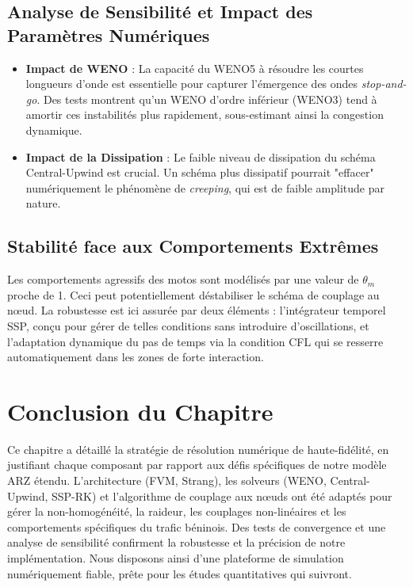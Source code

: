 \subsection{Analyse de Sensibilité et Impact des Paramètres Numériques}
\begin{itemize}
    \item \textbf{Impact de WENO} : La capacité du WENO5 à résoudre les courtes longueurs d'onde est essentielle pour capturer l'émergence des ondes \textit{stop-and-go}. Des tests montrent qu'un WENO d'ordre inférieur (WENO3) tend à amortir ces instabilités plus rapidement, sous-estimant ainsi la congestion dynamique.
    \item \textbf{Impact de la Dissipation} : Le faible niveau de dissipation du schéma Central-Upwind est crucial. Un schéma plus dissipatif pourrait "effacer" numériquement le phénomène de \textit{creeping}, qui est de faible amplitude par nature.
\end{itemize}

\subsection{Stabilité face aux Comportements Extrêmes}
Les comportements agressifs des motos sont modélisés par une valeur de $\theta_m$ proche de 1. Ceci peut potentiellement déstabiliser le schéma de couplage au nœud. La robustesse est ici assurée par deux éléments : l'intégrateur temporel SSP, conçu pour gérer de telles conditions sans introduire d'oscillations, et l'adaptation dynamique du pas de temps via la condition CFL qui se resserre automatiquement dans les zones de forte interaction.

\section{Conclusion du Chapitre}
Ce chapitre a détaillé la stratégie de résolution numérique de haute-fidélité, en justifiant chaque composant par rapport aux défis spécifiques de notre modèle ARZ étendu. L'architecture (FVM, Strang), les solveurs (WENO, Central-Upwind, SSP-RK) et l'algorithme de couplage aux nœuds ont été adaptés pour gérer la non-homogénéité, la raideur, les couplages non-linéaires et les comportements spécifiques du trafic béninois. Des tests de convergence et une analyse de sensibilité confirment la robustesse et la précision de notre implémentation. Nous disposons ainsi d'une plateforme de simulation numériquement fiable, prête pour les études quantitatives qui suivront.
